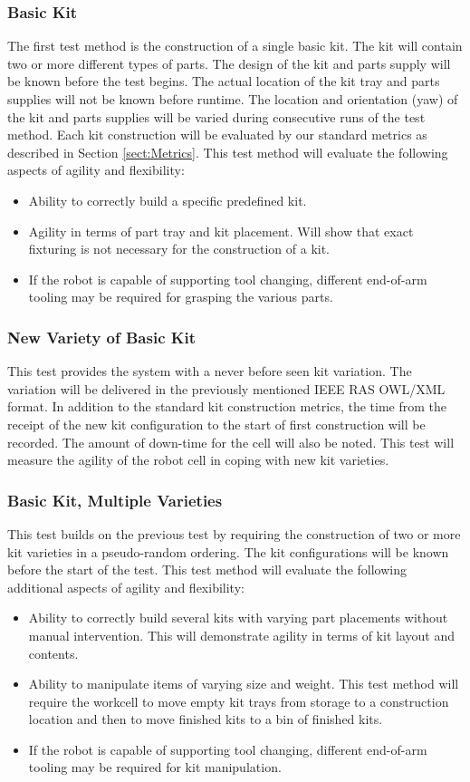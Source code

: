 \subsubsection{Basic Kit}
The first test method is the construction of a single basic kit. The kit will contain two or more different types of parts. The design of the
kit and parts supply will be known before the test begins. The actual location of the kit tray and parts supplies will not be known before
runtime. The location and orientation (yaw) of the kit and parts supplies will be varied during consecutive runs of the test method.
Each kit construction will be evaluated by our standard metrics as described in Section \ref{sect:Metrics}. 
This test method will evaluate the following aspects of agility and flexibility:
\begin{itemize}
	\item Ability to correctly build a specific predefined kit.
	\item Agility in terms of part tray and kit placement. Will show that exact fixturing is not necessary for the construction
	of a kit.
	\item If the robot is capable of supporting tool changing, different end-of-arm tooling may be required for grasping
	the various parts.
\end{itemize}

\subsubsection{New Variety of Basic Kit}
This test provides the system with a never before seen kit variation. The variation will be delivered in the previously
mentioned IEEE RAS OWL/XML format. In addition to the standard kit construction metrics, the time from the receipt
of the new kit configuration to the start of first construction will be recorded. The amount of down-time for the
cell will also be noted. This test will measure the agility of the robot cell in coping with new kit varieties.

\subsubsection{Basic Kit, Multiple Varieties}
This test builds on the previous test by requiring the construction of two or more kit varieties in a pseudo-random ordering.
The kit configurations will be known before the start of the test. 
This test method will evaluate the following additional aspects of agility and flexibility:
\begin{itemize}
	\item Ability to correctly build several kits with varying part placements without manual intervention.
	This will demonstrate agility in terms of kit layout and contents.
	\item Ability to manipulate items of varying size and weight. This test method will require the workcell
	to move empty kit trays from storage to a construction location and then to move finished kits to
	a bin of finished kits.
	\item If the robot is capable of supporting tool changing, different end-of-arm tooling may be required for 
	kit manipulation. 
\end{itemize}

